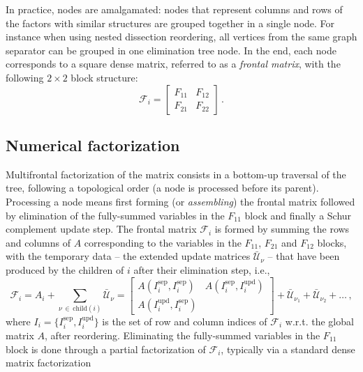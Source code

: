 \documentclass{article}
\begin{document}
In practice, nodes are amalgamated: nodes that represent columns and
rows of the factors with similar structures are grouped together in a
single node. For instance when using nested dissection reordering, all
vertices from the same graph separator can be grouped in one
elimination tree node. In the end, each node corresponds to a square
dense matrix, referred to as a \emph{frontal matrix}, with the
following $2 \times 2$ block structure:
\begin{equation}\label{eqn:frontal}
  \mathcal{F}_i = \begin{bmatrix}F_{11} & F_{12}\\ F_{21} & F_{22}\end{bmatrix} \, .
\end{equation}

\subsection{Numerical factorization}
Multifrontal factorization of the matrix consists in a bottom-up
traversal of the tree, following a topological order (a node is
processed before its parent). Processing a node means first forming
(or \emph{assembling}) the frontal matrix followed by elimination of
the fully-summed variables in the $F_{11}$ block and finally a Schur
complement update step. The frontal matrix $\mathcal{F}_i$ is formed
by summing the rows and columns of $A$ corresponding to the variables
in the $F_{11}$, $F_{21}$ and $F_{12}$ blocks, with the temporary
data -- the extended update matrices $\bar{\mathcal{U}}_\nu$ -- that have
been produced by the children of $i$ after their elimination step,
i.e.,
\begin{equation}\label{eqn:frontal_1}
  \mathcal{F}_i = {A}_i + \sum_{\nu \, \in \, \mathrm{child}(i)} \bar{\mathcal{U}}_\nu =
  \begin{bmatrix} 
    A(I^{\mathrm{sep}}_i,I^{\mathrm{sep}}_i) & A(I^{\mathrm{sep}}_i,I^{\mathrm{upd}}_i) \\ 
    A(I^{\mathrm{upd}}_i,I^{\mathrm{sep}}_i) & 
  \end{bmatrix} + \bar{\mathcal{U}}_{\nu_1} + \bar{\mathcal{U}}_{\nu_2} + \dots \, ,
\end{equation}
where $I_i = \{ I_i^{\mathrm{sep}}, I_i^{\mathrm{upd}} \}$ is the set
of row and column indices of $\mathcal{F}_i$ w.r.t. the global matrix
$A$, after reordering. Eliminating the fully-summed variables in the
$F_{11}$ block is done through a partial factorization of
$\mathcal{F}_i$, typically via a standard dense matrix factorization
\end{document}
